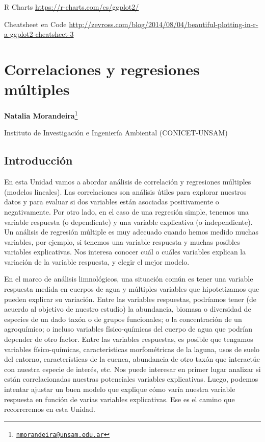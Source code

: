 \documentclass[
]{book}
\begin{document}
R Charts \url{https://r-charts.com/es/ggplot2/}

Cheatsheet en Code \url{http://zevross.com/blog/2014/08/04/beautiful-plotting-in-r-a-ggplot2-cheatsheet-3}

\hypertarget{regmul}{%
\chapter{Correlaciones y regresiones múltiples}\label{regmul}}

\textbf{Natalia Morandeira}\footnote{\href{mailto:nmorandeira@unsam.edu.ar}{\nolinkurl{nmorandeira@unsam.edu.ar}}}

Instituto de Investigación e Ingeniería Ambiental (CONICET-UNSAM)

\hypertarget{introducciuxf3n}{%
\section{Introducción}\label{introducciuxf3n}}

En esta Unidad vamos a abordar análisis de correlación y regresiones múltiples (modelos lineales). Las correlaciones son análisis útiles para explorar nuestros datos y para evaluar si dos variables están asociadas positivamente o negativamente. Por otro lado, en el caso de una regresión simple, tenemos una variable respuesta (o dependiente) y una variable explicativa (o independiente). Un análisis de regresión múltiple es muy adecuado cuando hemos medido muchas variables, por ejemplo, si tenemos una variable respuesta y muchas posibles variables explicativas. Nos interesa conocer cuál o cuáles variables explican la variación de la variable respuesta, y elegir el mejor modelo.

En el marco de análisis limnológicos, una situación común es tener una variable respuesta medida en cuerpos de agua y múltiples variables que hipotetizamos que pueden explicar su variación. Entre las variables respuestas, podríamos tener (de acuerdo al objetivo de nuestro estudio) la abundancia, biomasa o diversidad de especies de un dado taxón o de grupos funcionales; o la concentración de un agroquímico; o incluso variables físico-químicas del cuerpo de agua que podrían depender de otro factor. Entre las variables respuestas, es posible que tengamos variables físico-químicas, características morfométricas de la laguna, usos de suelo del entorno, características de la cuenca, abundancia de otro taxón que interactúe con nuestra especie de interés, etc. Nos puede interesar en primer lugar analizar si están correlacionadas nuestras potenciales variables explicativas. Luego, podemos intentar ajustar un buen modelo que explique cómo varía nuestra variable respuesta en función de varias variables explicativas. Ese es el camino que recorreremos en esta Unidad.
\end{document}

